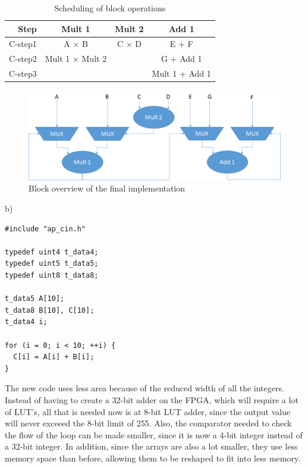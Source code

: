 \documentclass[11pt]{article}
\begin{document}
\begin{table}[h!]
  \centering
  \begin{tabular}{| r | c c c |}
    \hline
    Step & Mult 1 & Mult 2 & Add 1 \\
    \hline
    C-step1 & A $\times$ B & C $\times$ D & E + F \\
    C-step2 & Mult 1 $\times$ Mult 2 & & G + Add 1 \\
    C-step3 & & & Mult 1 + Add 1 \\
    \hline
  \end{tabular}
  \caption{Scheduling of block operations}
  \label{tab:q3_schedule}
\end{table}

\begin{figure}[h!]
  \centering
  \includegraphics[width=\linewidth]{q3_diagram.png}
  \caption{Block overview of the final implementation}
  \label{fig:q3_hw}
\end{figure}

\clearpage

b)
\begin{lstlisting}[showstringspaces=false]
#include "ap_cin.h"

typedef uint4 t_data4;
typedef uint5 t_data5;
typedef uint8 t_data8;

t_data5 A[10];
t_data8 B[10], C[10];
t_data4 i;

for (i = 0; i < 10; ++i) {
  C[i] = A[i] + B[i];
}
\end{lstlisting}

The new code uses less area because of the reduced width of all the integers. Instead of having to create a 32-bit adder on the FPGA, which will require a lot of LUT's, all that is needed now is at 8-bit LUT adder, since the output value will never exceeed the 8-bit limit of 255. Also, the comparator needed to check the flow of the loop can be made smaller, since it is now a 4-bit integer instead of a 32-bit integer. In addition, since the arrays are also a lot smaller, they use less memory space than before, allowing them to be reshaped to fit into less memory.
\end{document}
